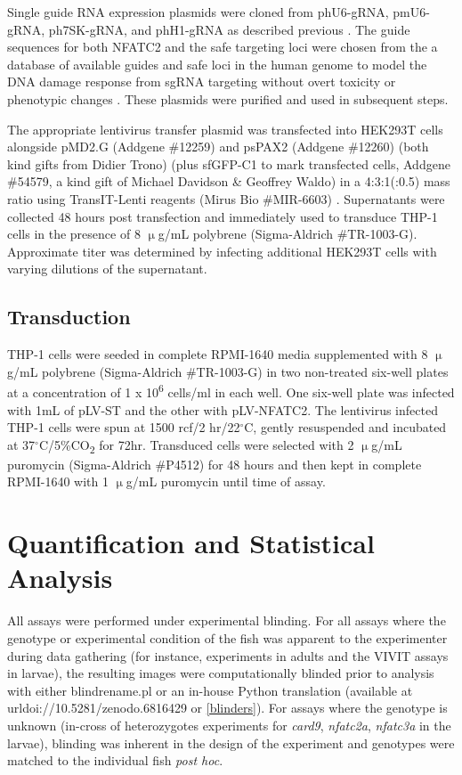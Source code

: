 Single guide RNA expression plasmids were cloned from phU6-gRNA, pmU6-gRNA, ph7SK-gRNA, and phH1-gRNA as described previous \citep{Kabadi2014}. The guide sequences for both NFATC2 and the safe targeting loci were chosen from the a database of available guides and safe loci in the human genome to model the DNA damage response from sgRNA targeting without overt toxicity or phenotypic changes \citep{Morgens2017}. These plasmids were purified and used in subsequent steps.

The appropriate lentivirus transfer plasmid was transfected into HEK293T cells alongside pMD2.G (Addgene \#12259) and psPAX2 (Addgene \#12260) (both kind gifts from Didier Trono) (plus sfGFP-C1 to mark transfected cells, Addgene \#54579, a kind gift of Michael Davidson \& Geoffrey Waldo) in a 4:3:1(:0.5) mass ratio using TransIT-Lenti reagents (Mirus Bio \#MIR-6603) \citep{Pedelacq2006}. Supernatants were collected 48 hours post transfection and immediately used to transduce THP-1 cells in the presence of 8 $\upmu$g/mL polybrene (Sigma-Aldrich \#TR-1003-G). Approximate titer was determined by infecting additional HEK293T cells with varying dilutions of the supernatant.

\subsection{Transduction}\label{transduction}

THP-1 cells were seeded in complete RPMI-1640 media supplemented with 8 $\upmu$g/mL polybrene (Sigma-Aldrich \#TR-1003-G) in two non-treated six-well plates at a concentration of 1 x 10\textsuperscript{6} cells/ml in each well. One six-well plate was infected with 1mL of pLV-ST and the other with pLV-NFATC2. The lentivirus infected THP-1 cells were spun at 1500 rcf/2 hr/22$^{\circ}$C, gently resuspended and incubated at 37$^{\circ}$C/5\%CO\textsubscript{2} for 72hr. Transduced cells were selected with 2 $\upmu$g/mL puromycin (Sigma-Aldrich \#P4512) for 48 hours and then kept in complete RPMI-1640 with 1 $\upmu$g/mL puromycin until time of assay.

\section{Quantification and Statistical Analysis}\label{quant:stats}

All assays were performed under experimental blinding. For all assays where the genotype or experimental condition of the fish was apparent to the experimenter during data gathering (for instance, experiments in adults and the VIVIT assays in larvae), the resulting images were computationally blinded prior to analysis with either blindrename.pl \citep{Salter2016} or an in-house Python translation (available at url{doi://10.5281/zenodo.6816429} or \autoref{blinders}). For assays where the genotype is unknown (in-cross of heterozygotes experiments for \textit{card9}, \textit{nfatc2a}, \textit{nfatc3a} in the larvae), blinding was inherent in the design of the experiment and genotypes were matched to the individual fish \textit{post hoc}. 

